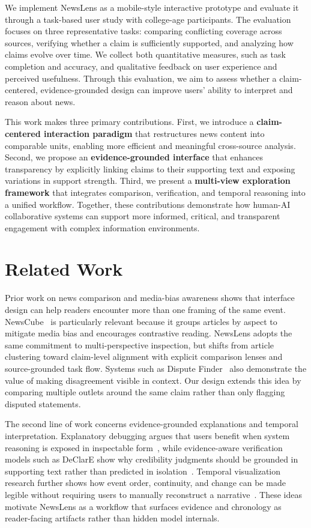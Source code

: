 \documentclass{vgtc}                          %
\begin{document}
We implement NewsLens as a mobile-style interactive prototype and evaluate it through a task-based user study with college-age participants. The evaluation focuses on three representative tasks: comparing conflicting coverage across sources, verifying whether a claim is sufficiently supported, and analyzing how claims evolve over time. We collect both quantitative measures, such as task completion and accuracy, and qualitative feedback on user experience and perceived usefulness. Through this evaluation, we aim to assess whether a claim-centered, evidence-grounded design can improve users’ ability to interpret and reason about news.

This work makes three primary contributions. First, we introduce a \textbf{claim-centered interaction paradigm} that restructures news content into comparable units, enabling more efficient and meaningful cross-source analysis. Second, we propose an \textbf{evidence-grounded interface} that enhances transparency by explicitly linking claims to their supporting text and exposing variations in support strength. Third, we present a \textbf{multi-view exploration framework} that integrates comparison, verification, and temporal reasoning into a unified workflow. Together, these contributions demonstrate how human-AI collaborative systems can support more informed, critical, and transparent engagement with complex information environments.

\section{Related Work}

Prior work on news comparison and media-bias awareness shows that interface design can help readers encounter more than one framing of the same event. NewsCube~\cite{Park_2009} is particularly relevant because it groups articles by aspect to mitigate media bias and encourages contrastive reading. NewsLens adopts the same commitment to multi-perspective inspection, but shifts from article clustering toward claim-level alignment with explicit comparison lenses and source-grounded task flow. Systems such as Dispute Finder~\cite{Ennals_2010} also demonstrate the value of making disagreement visible in context. Our design extends this idea by comparing multiple outlets around the same claim rather than only flagging disputed statements.

The second line of work concerns evidence-grounded explanations and temporal interpretation. Explanatory debugging argues that users benefit when system reasoning is exposed in inspectable form~\cite{Kulesza_2015}, while evidence-aware verification models such as DeClarE show why credibility judgments should be grounded in supporting text rather than predicted in isolation~\cite{Popat_2018}. Temporal visualization research further shows how event order, continuity, and change can be made legible without requiring users to manually reconstruct a narrative~\cite{Tanahashi_2012,Fulda_2016}. These ideas motivate NewsLens as a workflow that surfaces evidence and chronology as reader-facing artifacts rather than hidden model internals.
\end{document}
